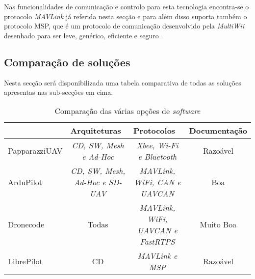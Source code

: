 Nas funcionalidades de comunicação e controlo para esta tecnologia encontra-se o protocolo \textit{MAVLink} já referida nesta secção e para além disso suporta também o protocolo MSP, que é um protocolo de comunicação desenvolvido pela \textit{MultiWii} desenhado para ser leve, genérico, eficiente e seguro \cite{MultiWii,MultiWiiForum}. 

\subsection{Comparação de soluções}

Nesta secção será disponibilizada uma tabela comparativa de todas as soluções apresentas nas sub-secções em cima.


\begin{table}[H]
\caption{Comparação das várias opções de \textit{software}}
\begin{tabular}{l|c|c|c|}
\cline{2-4}
& \multicolumn{1}{l|}{Arquiteturas}  & \multicolumn{1}{l|}{Protocolos}  & \multicolumn{1}{l|}{Documentação} \\ \hline
\multicolumn{1}{|l|}{PapparazziUAV} & \textit{CD, SW, Mesh e Ad-Hoc}  & \textit{Xbee, Wi-Fi e Bluetooth} & Razoável \\ \hline
\multicolumn{1}{|l|}{ArduPilot}     & \textit{CD, SW, Mesh, Ad-Hoc e SD-UAV} & \textit{MAVLink, WiFi, CAN e UAVCAN}      & Boa                               \\ \hline
\multicolumn{1}{|l|}{Dronecode}     & Todas                                  & \textit{MAVLink, WiFi, UAVCAN e FastRTPS} & Muito Boa                         \\ \hline
\multicolumn{1}{|l|}{LibrePilot}    & CD                       & \textit{MAVLink e MSP}                    & Razoável                          \\ \hline
\end{tabular}
\end{table}
